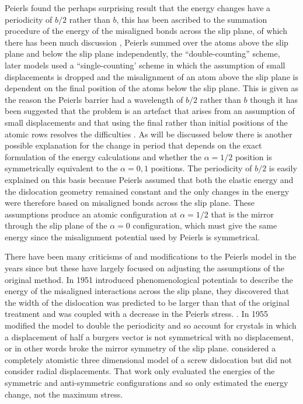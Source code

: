 Peierls found the perhaps surprising result that the energy changes have a periodicity of $b/2$ rather than $b$, this has been ascribed to the summation procedure of the energy of the misaligned bonds across the slip plane, of which there has been much discussion \cite{Hirth_Lothe1982lattice_periodicity,Lu2000peierls}, Peierls summed over the atoms above the slip plane and below the slip plane independently, the ``double-counting'' scheme, later models used a ``single-counting' scheme in which the assumption of small displacements is dropped and the misalignment of an atom above the slip plane is dependent on the final position of the atoms below the slip plane. This is given as the reason the Peierls barrier had a wavelength of $b/2$ rather than $b$ \cite{Hirth_Lothe1982lattice_periodicity,Lu2000peierls} though it has been suggested that the problem is an artefact that arises from an assumption of small displacements and that using the final rather than initial positions of the atomic rows resolves the difficulties \cite{Huntington1955}. As will be discussed below there is another possible explanation for the change in period that depends on the exact formulation of the energy calculations and whether the $\alpha=1/2$ position is symmetrically equivalent to the $\alpha = 0, 1$ positions. The periodicity of $b/2$ is easily explained on this basis because Peierls assumed that both the elastic energy and the dislocation geometry remained constant and the only changes in the energy were therefore based on misaligned bonds across the slip plane. These assumptions produce an atomic configuration at $\alpha=1/2$ that is the mirror through the slip plane of the $\alpha=0$ configuration, which must give the same energy since the misalignment potential used by Peierls is symmetrical.




There have been many criticisms of and modifications to the Peierls model in the years since but these have largely focused on adjusting the assumptions of the original method.
In 1951 \citet{Foreman1951} introduced phenomenological potentials to describe the energy of the misaligned interactions across the slip plane, they discovered that the width of the dislocation was predicted to be larger than that of the original treatment and was coupled with a decrease in the Peierls stress. .
In 1955 \citet{Huntington1955} modified the model to double the periodicity and so account for crystals in which a displacement of half a burgers vector is not symmetrical with no displacement, or in other words broke the mirror symmetry of the slip plane. 
\citet{Maradudin1959} considered a completely atomistic three dimensional model of a screw dislocation but did not consider radial displacements. That work only evaluated the energies of the symmetric and anti-symmetric configurations and so only estimated the energy change, not the maximum stress.



